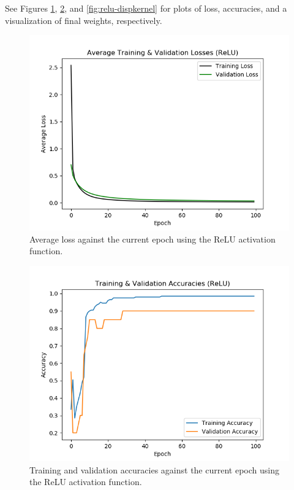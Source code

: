 \documentclass{article}
\begin{document}
\begin{enumerate}
\begin{enumerate}
                See Figures \ref{fig:relu-loss},
                \ref{fig:relu-accuracies}, and
                \ref{fig:relu-dispkernel}
                for plots of loss, accuracies, and a visualization of final weights,
                respectively.
                \begin{figure}[ht]
                  \begin{center}
                    \includegraphics[width=0.7\linewidth]{figures/relu-loss.png}
                    \caption{Average loss against the current epoch using the ReLU
                      activation function.}
                    \label{fig:relu-loss}
                  \end{center}
                \end{figure}
                \begin{figure}[ht]
                  \begin{center}
                    \includegraphics[width=0.7\linewidth]{figures/relu-accuracies.png}
                    \caption{Training and validation accuracies against the current epoch
                      using the ReLU activation function.}
                    \label{fig:relu-accuracies}
                  \end{center}

\end{figure}
\end{enumerate}
\end{enumerate}
\end{document}
